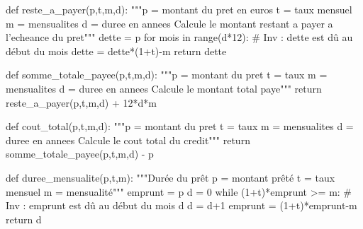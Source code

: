 \question{}
\begin{pyverbatim}
def reste_a_payer(p,t,m,d):
    """p = montant du pret en euros
       t = taux mensuel
       m = mensualites
       d = duree en annees
       Calcule le montant restant a payer a l'echeance   du pret"""
    dette = p
    for mois in range(d*12):
        # Inv : dette est dû au début du mois
        dette = dette*(1+t)-m
    return dette
    
\question{}    
    
def somme_totale_payee(p,t,m,d):
    """p = montant du pret
       t = taux
       m = mensualites
       d = duree en annees
       Calcule le montant total paye"""
    return reste_a_payer(p,t,m,d) + 12*d*m
    
\question{}

def cout_total(p,t,m,d):
    """p = montant du pret
       t = taux
       m = mensualites
       d = duree en annees
       Calcule le cout total du credit"""
    return somme_totale_payee(p,t,m,d) - p
\end{pyverbatim}

\question{}

\begin{pyverbatim}
def duree_mensualite(p,t,m):
    """Durée du prêt
       p = montant prêté
       t = taux mensuel
       m = mensualité"""
    emprunt = p
    d = 0
    while (1+t)*emprunt >= m:
        # Inv : emprunt est dû au début du mois d
        d = d+1
        emprunt = (1+t)*emprunt-m
    return d
\end{pyverbatim}

\question{}

\question{}